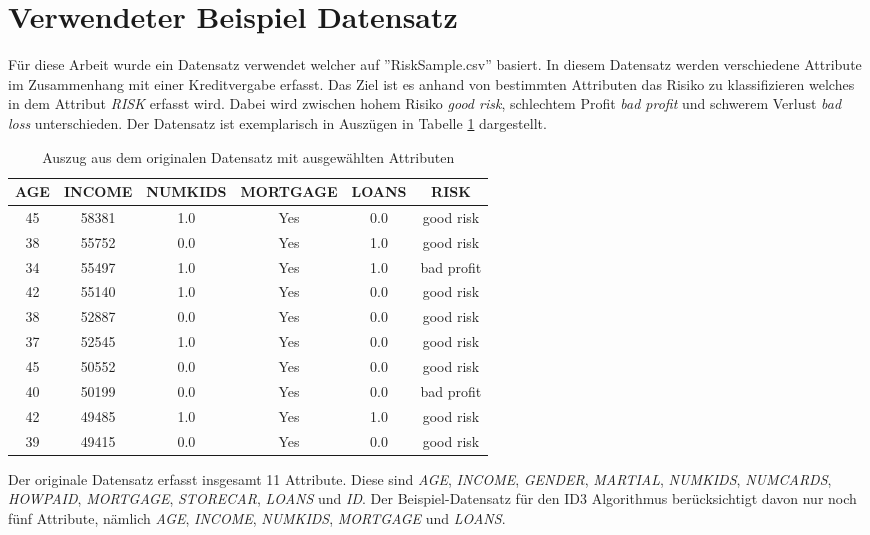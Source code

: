 \section{Verwendeter Beispiel Datensatz}
\label{id3:datensatz}
Für diese Arbeit wurde ein Datensatz verwendet welcher auf ''RiskSample.csv'' basiert. \Autocite{RiskSample} In diesem Datensatz werden verschiedene Attribute im Zusammenhang mit einer Kreditvergabe erfasst. Das Ziel ist es anhand von bestimmten Attributen das Risiko zu klassifizieren welches in dem Attribut \textit{RISK} erfasst wird. Dabei wird zwischen hohem Risiko \textit{good risk}, schlechtem Profit \textit{bad profit} und schwerem Verlust \textit{bad loss} unterschieden.
Der Datensatz ist exemplarisch in Auszügen in Tabelle \ref{table:datensatz} dargestellt. 

\begin{center}
    \begin{table}[htbp]
        \begin{tabularx}{\linewidth}{cccccc}
            \toprule
            \textbf{AGE} & \textbf{INCOME} & \textbf{NUMKIDS} & \textbf{MORTGAGE} & \textbf{LOANS} & \textbf{RISK} \\
            \toprule
            45 & 58381 & 1.0 & Yes & 0.0 & good risk \\
            38 & 55752 & 0.0 & Yes & 1.0 & good risk \\
            34 & 55497 & 1.0 & Yes & 1.0 & bad profit \\
            42 & 55140 & 1.0 & Yes & 0.0 & good risk \\
            38 & 52887 & 0.0 & Yes & 0.0 & good risk \\
            37 & 52545 & 1.0 & Yes & 0.0 & good risk \\
            45 & 50552 & 0.0 & Yes & 0.0 & good risk \\
            40 & 50199 & 0.0 & Yes & 0.0 & bad profit \\
            42 & 49485 & 1.0 & Yes & 1.0 & good risk \\
            39 & 49415 & 0.0 & Yes & 0.0 & good risk \\
            \bottomrule
        \end{tabularx}
        \caption{Auszug aus dem originalen Datensatz mit ausgewählten Attributen}
        \label{table:datensatz}
    \end{table}
\end{center}

Der originale Datensatz erfasst insgesamt 11 Attribute. Diese sind \textit{AGE}, \textit{INCOME}, \textit{GENDER}, \textit{MARTIAL}, \textit{NUMKIDS}, \textit{NUMCARDS}, \textit{HOWPAID}, \textit{MORTGAGE}, \textit{STORECAR}, \textit{LOANS} und \textit{ID}. Der Beispiel-Datensatz für den ID3 Algorithmus berücksichtigt davon nur noch fünf Attribute, nämlich \textit{AGE}, \textit{INCOME}, \textit{NUMKIDS}, \textit{MORTGAGE} und \textit{LOANS}.

